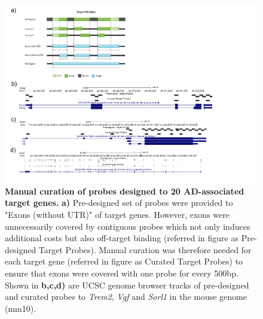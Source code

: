 \begin{landscape}
	\begin{figure}[ht]
		\begin{center}
			\includegraphics[page=1,trim={0cm 2cm 0cm 0cm},clip,scale = 0.70]{Figures/TargetProbes_Visualisation.pdf}
		\end{center}
		\captionsetup{width=1.5\textwidth}
		\caption[Manual curation of probes designed to 20 AD-associated target genes]%
		{\textbf{Manual curation of probes designed to 20 AD-associated target genes.} \textbf{a)} Pre-designed set of probes were provided to "Exons (without UTR)" of target genes. However, exons were unnecessarily covered by contiguous probes which not only induces additional costs but also off-target binding (referred in figure as Pre-designed Target Probes). Manual curation was therefore needed for each target gene (referred in figure as Curated Target Probes) to ensure that exons were covered with one probe for every 500bp. Shown in \textbf{b,c,d)} are UCSC genome browser tracks of pre-designed and curated probes to \textit{Trem2}, \textit{Vgf} and \textit{Sorl1} in the mouse genome (mm10).}
		\label{fig:target_probes_eg}
	\end{figure}
\end{landscape}

